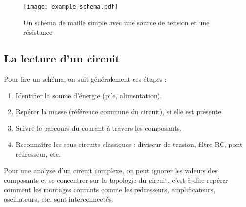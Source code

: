 \begin{figure}[H]
    \texttt{[image: example-schema.pdf]}
    \caption{
        Un schéma de maille simple avec une source de tension et une r\'esistance
    }
\end{figure}

\subsection{La lecture d’un circuit}

\begin{Note}
Pour lire un schéma, on suit généralement ces étapes :
\begin{enumerate}
  \item Identifier la source d’énergie (pile, alimentation).
  \item Repérer la masse (référence commune du circuit), si elle est présente.
  \item Suivre le parcours du courant à travers les composants.
  \item Reconnaître les sous-circuits classiques : diviseur de tension, filtre RC, pont redresseur, etc.
\end{enumerate}

Pour une analyse d'un circuit complexe, on peut ignorer les valeurs des composants et se concentrer sur la topologie du circuit,
c'est-à-dire repérer comment les montages courants comme les redresseurs, amplificateurs, oscillateurs, etc. sont interconnectés.
\end{Note}
